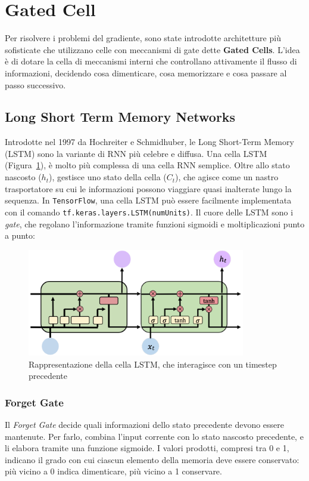 \section{Gated Cell}

Per risolvere i problemi del gradiente, sono state introdotte architetture più sofisticate che utilizzano celle con meccanismi di gate dette \textbf{Gated Cells}. L'idea è di dotare la cella di meccanismi interni che controllano attivamente il flusso di informazioni, decidendo cosa dimenticare, cosa memorizzare e cosa passare al passo successivo.

\subsection{Long Short Term Memory Networks}
Introdotte nel 1997 da Hochreiter e Schmidhuber, le Long Short-Term Memory (LSTM) sono la variante di RNN più celebre e diffusa. Una cella LSTM (Figura~\ref{fig:LSTMSchema}), è molto più complessa di una cella RNN semplice. Oltre allo stato nascosto ($h_t$), gestisce uno stato della cella ($C_t$), che agisce come un nastro trasportatore su cui le informazioni possono viaggiare quasi inalterate lungo la sequenza. In \texttt{TensorFlow}, una cella LSTM può essere facilmente implementata con il comando \texttt{tf.keras.layers.LSTM(numUnits)}. Il cuore delle LSTM sono i \textit{gate}, che regolano l'informazione tramite funzioni sigmoidi e moltiplicazioni punto a punto:

\begin{figure}
    \centering
    \includegraphics[width=0.85\textwidth]{figure/LSTMSchema.png}
    \caption{Rappresentazione della cella LSTM, che interagisce con un timestep precedente}
    \label{fig:LSTMSchema}
\end{figure}

\subsubsection{Forget Gate}
Il \textit{Forget Gate} decide quali informazioni dello stato precedente devono essere mantenute. Per farlo, combina l'input corrente con lo stato nascosto precedente, e li elabora tramite una funzione sigmoide. I valori prodotti, compresi tra 0 e 1, indicano il grado con cui ciascun elemento della memoria deve essere conservato: più vicino a 0 indica dimenticare, più vicino a 1 conservare.

